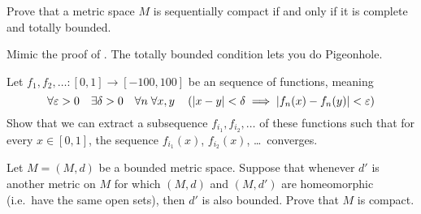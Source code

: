 \begin{dproblem}
	\gim
	Prove that a metric space $M$ is sequentially compact
	if and only if it is complete and totally bounded.
	\label{thm:bzw}
	\begin{hint}
		Mimic the proof of .
		The totally bounded condition lets you do Pigeonhole.
	\end{hint}
\end{dproblem}

\begin{problem}
	\gim
	Let
	$f_1, f_2, \ldots \colon [0,1] \to [-100,100]$
	be an  sequence of functions, meaning
	\[
		\forall \varepsilon > 0 \quad
		\exists \delta > 0 \quad
		\forall n \;
		\forall x,y \quad
		\left( \left\lvert x-y \right\rvert <\delta
		\implies \left\lvert f_n(x) - f_n(y) \right\rvert < \varepsilon \right)
	\]
	Show that we can extract a subsequence $f_{i_1}, f_{i_2}, \dots$
	of these functions such that for every $x \in [0,1]$,
	the sequence $f_{i_1}(x)$, $f_{i_2}(x)$, \dots\ converges.
\end{problem}

\begin{problem}
	\gim
	Let $M = (M,d)$ be a bounded metric space.
	Suppose that whenever $d'$ is another metric on $M$
	for which $(M,d)$ and $(M,d')$ are homeomorphic
	(i.e.\ have the same open sets), then $d'$ is also bounded.
	Prove that $M$ is compact.
\end{problem}

